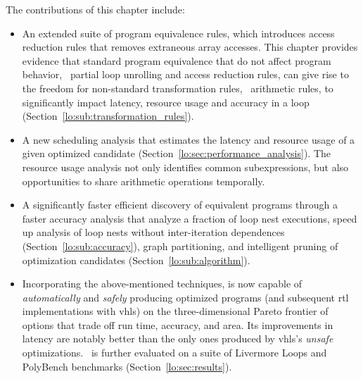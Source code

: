 The contributions of this chapter include:
\begin{itemize}

    \item An extended suite of program equivalence rules, which introduces
    access reduction rules that removes extraneous array accesses.  This
    chapter provides evidence that standard program equivalence that do not
    affect program behavior, \eg~partial loop unrolling and access reduction
    rules, can give rise to the freedom for non-standard transformation rules,
    \eg~arithmetic rules, to significantly impact latency, resource usage and
    accuracy in a loop (Section~\ref{lo:sub:transformation_rules}).

    \item A new scheduling analysis that estimates the
    latency and resource usage of a given optimized candidate
    (Section~\ref{lo:sec:performance_analysis}).  The resource usage analysis
    not only identifies common subexpressions, but also opportunities to share
    arithmetic operations temporally.

    \item A significantly faster efficient discovery of equivalent
    programs through a faster accuracy analysis that analyze a fraction
    of loop nest executions, speed up analysis of loop nests without
    inter-iteration dependences (Section~\ref{lo:sub:accuracy}), graph
    partitioning, and intelligent pruning of optimization candidates
    (Section~\ref{lo:sub:algorithm}).

    \item Incorporating the above-mentioned techniques, \soap{} is now
    capable of \emph{automatically} and \emph{safely} producing optimized
    programs (and subsequent \gls{rtl} implementations with \gls{vhls}) on
    the three-dimensional Pareto frontier of options that trade off run time,
    accuracy, and area.  Its improvements in latency are notably better than
    the only ones produced by \gls{vhls}'s \emph{unsafe} optimizations.
    \soap~is further evaluated on a suite of Livermore Loops and PolyBench
    benchmarks (Section~\ref{lo:sec:results}).

\end{itemize}

